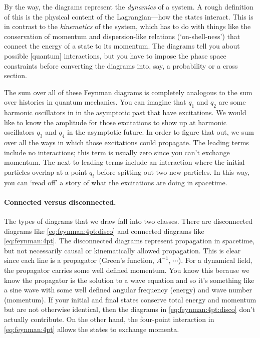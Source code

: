 By the way, the diagrams represent the \emph{dynamics} of a system. A rough definition of this is the physical content of the Lagrangian---how the states interact. This is in contrast to the \emph{kinematics} of the system, which has to do with things like the conservation of momentum  and dispersion-like relations (`on-shell-ness') that connect the energy of a state to its momentum. The diagrams tell you about possible [quantum] interactions, but you have to impose the phase space constraints before converting the diagrams into, say, a probability or a cross section.

The sum over all of these Feynman diagrams is completely analogous to the sum over histories in quantum mechanics. You can imagine that $q_1$ and $q_2$ are some harmonic oscillators in in the asymptotic past that have excitations. We would like to know the amplitude for those excitations to show up at harmonic oscillators $q_3$ and $q_4$ in the asymptotic future. In order to figure that out, we sum over all the ways in which those excitations could propagate. The leading terms include no interactions; this term is usually zero since you can't exchange momentum. The next-to-leading terms include an interaction where the initial particles overlap at a point $q_i$ before spitting out two new particles. In this way, you can `read off' a story of what the excitations are doing in spacetime. 

\paragraph{Connected versus disconnected.} The types of diagrams that we draw fall into two classes. There are disconnected diagrams like 
\eqref{eq:feynman:4pt:disco} and connected diagrams like \eqref{eq:feynman:4pt}. The disconnected diagrams represent propagation in spacetime, but not necessarily causal or kinematically allowed propagation. This is clear since each line is a propagator (Green's function, $A^{-1}$, $\cdots$). For a dynamical field, the propagator carries some well defined momentum. You know this because we know the propagator is the solution to a wave equation and so it's something like a sine wave with some well defined angular frequency (energy) and wave number (momentum).  If your initial and final states conserve total energy and momentum but are not otherwise identical, then the diagrams in \eqref{eq:feynman:4pt:disco} don't actually contribute. On the other hand, the four-point interaction in \eqref{eq:feynman:4pt} allows the states to exchange momenta. 

